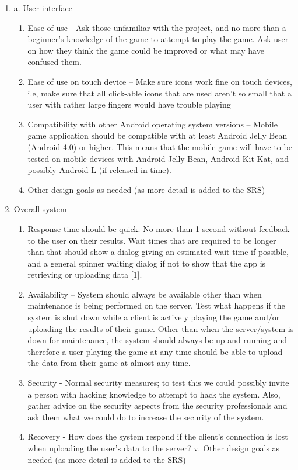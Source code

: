 \documentclass[a4wide]{article}
\begin{document}
\begin{enumerate}
\begin{enumerate}
\item a.	User interface
\begin{enumerate}
\item	Ease of use - Ask those unfamiliar with the project, and no more than a beginner’s knowledge of the game to attempt to play the game. Ask user on how they think the game could be improved or what may have confused them.
\item	Ease of use on touch device – Make sure icons work fine on touch devices, i.e, make sure that all click-able icons that are used aren't so small that a user with rather large fingers would have trouble playing
\item	Compatibility with other Android operating system versions – Mobile game application should be compatible with at least Android Jelly Bean (Android 4.0) or higher. This means that the mobile game will have to be tested on mobile devices with Android Jelly Bean, Android Kit Kat, and possibly Android L (if released in time).
\item 	Other design goals as needed (as more detail is added to the SRS)
\end{enumerate}
\item	Overall system
\begin{enumerate}
\item	 Response time should be quick. No more than 1 second without feedback to the user on their results. Wait times that are required to be longer than that should show a dialog giving an estimated wait time if possible, and a general spinner waiting dialog if not  to show that the app is retrieving or uploading data [1].
\item	Availability – System should always be available other than when maintenance is being performed on the server. Test what happens if the system is shut down while a client is actively playing the game and/or uploading the results of their game. Other than when the server/system is down for maintenance, the system should always be up and running and therefore a user playing the game at any time should be able to upload the data from their game at almost any time.
\item	Security - Normal security measures; to test this we could possibly invite a person with hacking knowledge to attempt to hack the system. Also, gather advice on the security aspects from the security professionals  and ask them what we could do to increase the security of the system.
\item	Recovery - How does the system respond if the client’s connection is lost when uploading the user’s data to the server?
v.	Other design goals as needed (as more detail is added to the SRS)
\end{enumerate}


\end{enumerate}
\end{enumerate}
\end{document}

